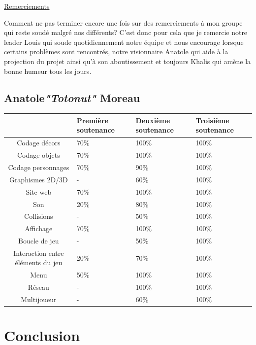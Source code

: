 \documentclass{article}
\begin{document}
\par
\underline{Remerciements}
\newline
\par
Comment ne pas terminer encore une fois sur des remerciements à mon groupe qui reste soudé malgré nos différents? C'est donc pour cela que je remercie notre leader Louis qui soude quotidiennement notre équipe et nous encourage lorsque certains problèmes sont rencontrés, notre visionnaire Anatole qui aide à la projection du projet ainsi qu'à son aboutissement et toujours Khalis qui amène la bonne humeur tous les jours.

\newpage

\subsection {Anatole\textcolor {pseudoblue} {\textit {"Totonut"}} Moreau}
\newpage
\begin{tabular}{|c|p{2cm}|p{2cm}|p{2cm}|}


\hline
& Première soutenance & Deuxième soutenance & Troisième soutenance\\ 
\hline

Codage décors & 70\% & 100\% & 100\%\\
\hline
Codage objets & 70\% & 100\% & 100\%\\
\hline
Codage personnages & 70\% & 90\% & 100\%\\
\hline

Graphismes 2D/3D & - & 60\% & 100\%\\
\hline

Site web & 70\% & 100\% & 100\%\\
\hline

Son & 20\% & 80\% & 100\%\\
\hline

Collisions & - & 50\% & 100\%\\
\hline

Affichage & 70\% & 100\% & 100\%\\
\hline

Boucle de jeu & - & 50\% & 100\%\\
\hline

Interaction entre éléments du jeu & 20\% & 70\% & 100\%\\
\hline

Menu & 50\% & 100\% & 100\%\\
\hline

Réseau & - & 100\% & 100\%\\
\hline

Multijoueur & - & 60\% & 100\%\\
\hline

\end{tabular}

\section{Conclusion}
\end{document}
